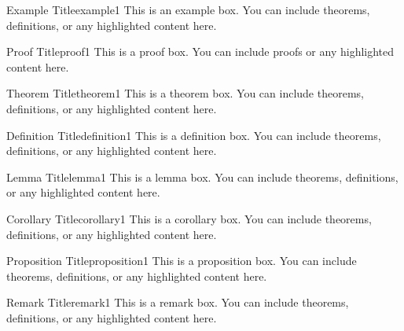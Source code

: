 \begin{Example}{Example Title}{example1}
This is an example box. You can include theorems, definitions, or any highlighted content here.
\end{Example}

\begin{Proof}{Proof Title}{proof1}
This is a proof box. You can include proofs or any highlighted content here.
\end{Proof}

\begin{Theorem}{Theorem Title}{theorem1}
This is a theorem box. You can include theorems, definitions, or any highlighted content here.
\end{Theorem}

\begin{Definition}{Definition Title}{definition1}
This is a definition box. You can include theorems, definitions, or any highlighted content here.
\end{Definition}

\begin{Lemma}{Lemma Title}{lemma1}
This is a lemma box. You can include theorems, definitions, or any highlighted content here.
\end{Lemma}

\begin{Corollary}{Corollary Title}{corollary1}
This is a corollary box. You can include theorems, definitions, or any highlighted content here.
\end{Corollary}

\begin{Proposition}{Proposition Title}{proposition1}
This is a proposition box. You can include theorems, definitions, or any highlighted content here.
\end{Proposition}

\begin{Remark}{Remark Title}{remark1}
This is a remark box. You can include theorems, definitions, or any highlighted content here.
\end{Remark}